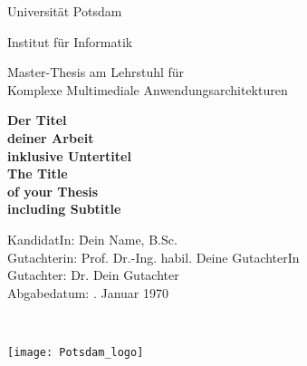 \newpage

\thispagestyle{empty}
\cleardoublepage

\thispagestyle{empty}

\begin{center}
    \vspace{.5cm}
    
    {\Large \sc Universität Potsdam}\\
    \vspace{.5cm}
    
    {\huge \sc Institut für Informatik\\[1mm]}
    \vspace{1cm}

    {\Large Master-Thesis am Lehrstuhl für}\\
    {\Large Komplexe Multimediale Anwendungsarchitekturen}\\
    \vspace{1.5cm}
    
    {\huge \textbf{Der Titel}}\\
    \vspace*{2mm}
    {\huge \textbf{deiner Arbeit}}\\
    \vspace*{2mm}
    {\large \textbf{inklusive Untertitel}}\\
    
    \vspace{1cm}
    {\huge \textbf{The Title}}\\ 
    \vspace*{2mm}
    {\huge \textbf{of your Thesis}}\\
    \vspace*{2mm}
    {\large \textbf{including Subtitle}}\\
    \vspace{1.5cm}
    
    \parbox{1cm}{
      \begin{large}
        \begin{tabbing}
	        KandidatIn: \hspace{1.5cm} \=Dein Name, B.Sc.\\[2mm]
	    	  Gutachterin: \>Prof. Dr.-Ing. habil. Deine GutachterIn\\
	    		Gutachter:	 \>Dr. Dein Gutachter\\[2mm]
	    		Abgabedatum: . Januar 1970\\
        \end{tabbing}
      \end{large}
    }\\
    \vspace{1.5mm}
    
    \texttt{[image: Potsdam\_logo]}
\end{center}
